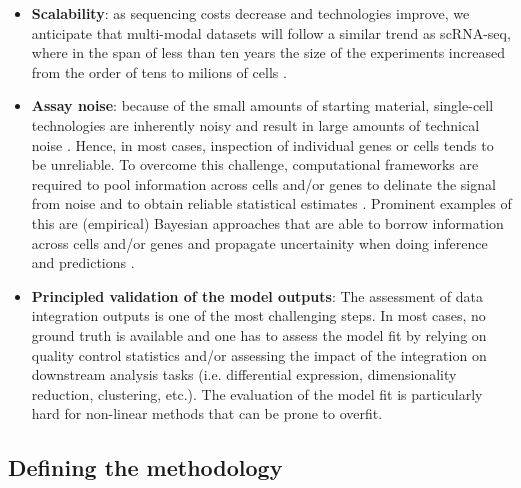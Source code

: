 \begin{itemize}
	\item \textbf{Scalability}: as sequencing costs decrease and technologies improve, we anticipate that multi-modal datasets will follow a similar trend as scRNA-seq, where in the span of less than ten years the size of the experiments increased from the order of tens to milions of cells \cite{Svensson2018}.

	\item \textbf{Assay noise}: because of the small amounts of starting material, single-cell technologies are inherently noisy and result in large amounts of technical noise \cite{Stegle2015}. Hence, in most cases, inspection of individual genes or cells tends to be unreliable. To overcome this challenge, computational frameworks are required to pool information across cells and/or genes to delinate the signal from noise and to obtain reliable statistical estimates \cite{Vallejos2015}. Prominent examples of this are (empirical) Bayesian approaches that are able to borrow information across cells and/or genes and propagate uncertainity when doing inference and predictions \cite{Kharchenko2014}.


	\item \textbf{Principled validation of the model outputs}: The assessment of data integration outputs is one of the most challenging steps. In most cases, no ground truth is available and one has to assess the model fit by relying on quality control statistics and/or assessing the impact of the integration on downstream analysis tasks (i.e. differential expression, dimensionality reduction, clustering, etc.). The evaluation of the model fit is particularly hard for non-linear methods that can be prone to overfit. 

\end{itemize}

\subsection{Defining the methodology}

